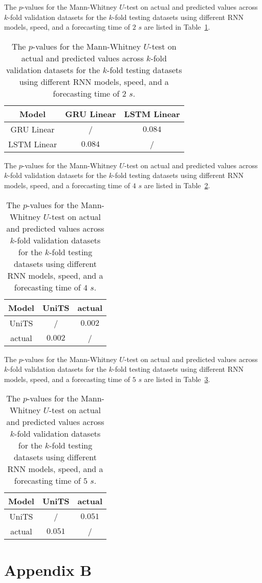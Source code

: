 The $p$-values for the Mann-Whitney $U$-test on actual and predicted values across $k$-fold validation datasets for the $k$-fold testing datasets using different RNN models, speed, and a forecasting time of $2$ $s$ are listed in Table~\ref{tab:speed:p:2}.

\begin{table}[!ht]
	\centering
	\begin{tabular}{|c|c|c|}
		\hline
		Model & GRU Linear & LSTM Linear \\ \hline
		GRU Linear & / & $\mathbf{0.084}$ \\ \hline
		LSTM Linear & $\mathbf{0.084}$ & / \\ \hline
	\end{tabular}
	\caption{The $p$-values for the Mann-Whitney $U$-test on actual and predicted values across $k$-fold validation datasets for the $k$-fold testing datasets using different RNN models, speed, and a forecasting time of $2$ $s$.}
	\label{tab:speed:p:2}
\end{table}

The $p$-values for the Mann-Whitney $U$-test on actual and predicted values across $k$-fold validation datasets for the $k$-fold testing datasets using different RNN models, speed, and a forecasting time of $4$ $s$ are listed in Table~\ref{tab:speed:p:4}.

\begin{table}[!ht]
	\centering
	\begin{tabular}{|c|c|c|}
		\hline
		Model & UniTS & actual \\ \hline
		UniTS & / & $\mathbf{0.002}$ \\ \hline
		actual & $\mathbf{0.002}$ & / \\ \hline
	\end{tabular}
	\caption{The $p$-values for the Mann-Whitney $U$-test on actual and predicted values across $k$-fold validation datasets for the $k$-fold testing datasets using different RNN models, speed, and a forecasting time of $4$ $s$.}
	\label{tab:speed:p:4}
\end{table}

The $p$-values for the Mann-Whitney $U$-test on actual and predicted values across $k$-fold validation datasets for the $k$-fold testing datasets using different RNN models, speed, and a forecasting time of $5$ $s$ are listed in Table~\ref{tab:speed:p:5}.

\begin{table}[!ht]
	\centering
	\begin{tabular}{|c|c|c|}
		\hline
		Model & UniTS & actual \\ \hline
		UniTS & / & $\mathbf{0.051}$ \\ \hline
		actual & $\mathbf{0.051}$ & / \\ \hline
	\end{tabular}
	\caption{The $p$-values for the Mann-Whitney $U$-test on actual and predicted values across $k$-fold validation datasets for the $k$-fold testing datasets using different RNN models, speed, and a forecasting time of $5$ $s$.}
	\label{tab:speed:p:5}
\end{table}

\appendix
\section{Appendix B}
\label{appB}

